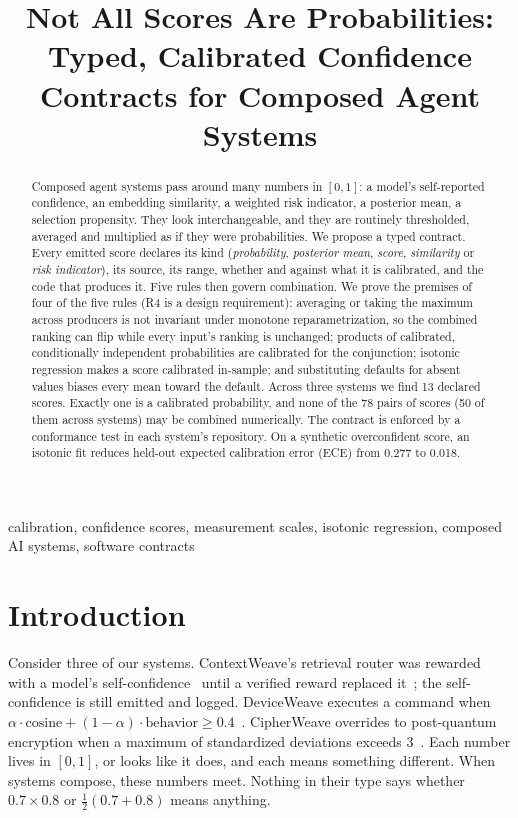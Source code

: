 \documentclass[conference]{IEEEtran}
\begin{document}
\title{Not All Scores Are Probabilities: Typed, Calibrated Confidence Contracts for Composed Agent Systems}

\author{
}

\maketitle

\begin{abstract}
Composed agent systems pass around many numbers in $[0,1]$: a model's self-reported confidence, an embedding similarity, a weighted risk indicator, a posterior mean, a selection propensity. They look interchangeable, and they are routinely thresholded, averaged and multiplied as if they were probabilities. We propose a typed contract. Every emitted score declares its kind (\emph{probability}, \emph{posterior mean}, \emph{score}, \emph{similarity} or \emph{risk indicator}), its source, its range, whether and against what it is calibrated, and the code that produces it. Five rules then govern combination. We prove the premises of four of the five rules (R4 is a design requirement): averaging or taking the maximum across producers is not invariant under monotone reparametrization, so the combined ranking can flip while every input's ranking is unchanged; products of calibrated, conditionally independent probabilities are calibrated for the conjunction; isotonic regression makes a score calibrated in-sample; and substituting defaults for absent values biases every mean toward the default. Across three systems we find 13 declared scores. Exactly one is a calibrated probability, and none of the 78 pairs of scores (50 of them across systems) may be combined numerically. The contract is enforced by a conformance test in each system's repository. On a synthetic overconfident score, an isotonic fit reduces held-out expected calibration error (ECE) from 0.277 to 0.018.
\end{abstract}

\begin{IEEEkeywords}
calibration, confidence scores, measurement scales, isotonic regression, composed AI systems, software contracts
\end{IEEEkeywords}

\section{Introduction}
Consider three of our systems. ContextWeave's retrieval router was rewarded with a model's self-confidence~\cite{prior-router} until a verified reward replaced it~\cite{comp-verified}; the self-confidence is still emitted and logged. DeviceWeave executes a command when $\alpha\cdot\text{cosine}+(1-\alpha)\cdot\text{behavior}\ge0.4$~\cite{prior-device}. CipherWeave overrides to post-quantum encryption when a maximum of standardized deviations exceeds 3~\cite{prior-cipher,comp-drift}. Each number lives in $[0,1]$, or looks like it does, and each means something different. When systems compose, these numbers meet. Nothing in their type says whether $0.7\times0.8$ or $\frac12(0.7+0.8)$ means anything.
\end{document}
